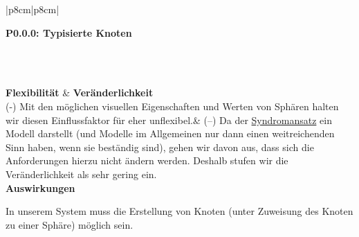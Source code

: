\documentclass[enabledeprecatedfontcommands,fontsize=11pt,paper=a4,twoside]{scrartcl}
\newcounter{one}
\newcounter{two}[one]
\newcounter{three}[two]
\newcommand{\tone}{0\theone}
\newcommand{\ttwo}{0\thetwo}
\newcommand{\three}{\stepcounter{three}0\thethree}
\begin{document}
\begin{tabular} {|p{8cm}|p{8cm}|}
	\hline
	 {\parbox{16cm}{\textbf{\hypertarget{p}{P\tone.\ttwo.\three}: Typisierte Knoten}} } \\ \hline\hline 
	\rule{0pt}{4ex}\\ [2ex] \hline
	\textbf{Flexibilität}  & \textbf{Veränderlichkeit} \\
	(-) Mit den möglichen visuellen Eigenschaften und Werten von Sphären halten wir diesen Einflussfaktor für eher unflexibel.& 
	(–) Da der \hyperlink{Syndromansatz}{Syndromansatz} ein Modell darstellt (und Modelle im Allgemeinen nur dann einen weitreichenden Sinn haben, wenn sie beständig sind), gehen wir davon aus, dass sich die Anforderungen hierzu nicht ändern werden. Deshalb stufen wir die Veränderlichkeit als sehr gering ein.\\
	\hline
	 {\textbf{Auswirkungen}} \\
	 {\parbox{16cm}{In unserem System muss die Erstellung von Knoten (unter Zuweisung des Knoten zu einer Sphäre) möglich sein.} }\\ \hline
\end{tabular}
\\ \\ \\ \\ \\
\end{document}
